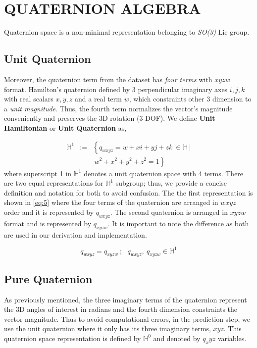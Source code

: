 \documentclass[letterpaper, 10 pt, conference]{ieeeconf}  %
\begin{document}
\section{QUATERNION ALGEBRA} \label{sec:QuatAlg}

Quaternion space is a non-minimal representation belonging to \textit{SO(3)} Lie group.

\subsection{Unit Quaternion}
Moreover, the quaternion term from the dataset has \textit{four terms} with $xyzw$
format.
Hamilton's quaternion defined by 3 perpendicular imaginary axes $i,j,k$ with
real scalars $x,y,z$ and a real term $w$, which constraints other 3 dimension to
a \textit{unit magnitude}. Thus, the fourth term normalizes the vector's magnitude
conveniently and preserves the 3D rotation (3 DOF). We define \textbf{Unit Hamiltonian}
or \textbf{Unit Quaternion} as,


\begin{eqnarray}\nonumber
\label{eq:9}
\mathbb{H}^{1} &:=&\left\{ q_{wxyz}=w+xi+yj+zk~\in \mathbb{H}~| \right.\\
                   && \left.~w^{2}+x^{2}+y^{2}+z^{2}=1 \right\}
\end{eqnarray}
\noindent
where superscript 1 in $\mathbb{H}^{1}$ denotes a unit quaternion space with 4
terms. There are two equal representations for $\mathbb{H}^{1}$ subgroup; thus,
we provide a concise definition and notation for both to avoid confusion. The
the first representation is shown in \ref{eq:5} where the four terms of the
quaternion are arranged in $wxyz$ order and it is represented by $q_{wxyz}$.
The second quaternion is arranged in $xyzw$ format and is represented by $q_{xyzw}$.
It is important to note the difference as both are used in our derivation and
implementation.

\begin{equation}
\label{eq:12}
q_{wxyz} = q_{xyzw} ~; ~~~ q_{wxyz},~q_{xyzw} \in \mathbb{H}^{1}
\end{equation}


\subsection{Pure Quaternion}
As previously mentioned, the three imaginary terms of the quaternion represent the
3D angles of interest in radians and the fourth dimension constraints the vector
magnitude. Thus to avoid computational errors, in the prediction step, we use
the unit quaternion where it only has its three imaginary terms, $xyz$.
This quaternion space representation is defined by $\mathbb{H}^{0}$ and
denoted by $q_xyz$ variables.
\end{document}
